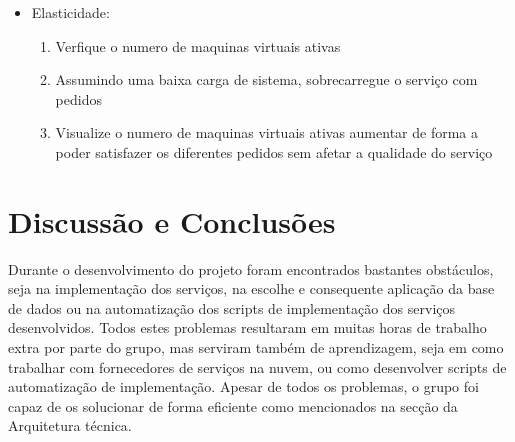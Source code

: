 \documentclass[11pt,a4paper]{article}
\begin{document}
\begin{itemize}
	\begin{enumerate}
		\item 
	\end{enumerate}
	\item Elasticidade:
	\begin{enumerate}
		\item Verfique o numero de maquinas virtuais ativas
		\item Assumindo uma baixa carga de sistema, sobrecarregue o serviço com pedidos
		\item Visualize o numero de maquinas virtuais ativas aumentar de forma a poder satisfazer os diferentes pedidos sem afetar a qualidade do serviço
	\end{enumerate}
\end{itemize}

\section{Discussão e Conclusões}
Durante o desenvolvimento do projeto foram encontrados bastantes obstáculos, seja na implementação dos serviços, na escolhe e consequente aplicação da base de dados ou na automatização dos scripts de implementação dos serviços desenvolvidos. Todos estes problemas resultaram em muitas horas de trabalho extra por parte do grupo, mas serviram também de aprendizagem, seja em como trabalhar com fornecedores de serviços na nuvem, ou como desenvolver scripts de automatização de implementação. Apesar de todos os problemas, o grupo foi capaz de os solucionar de forma eficiente como mencionados na secção da Arquitetura técnica.
\end{document}
